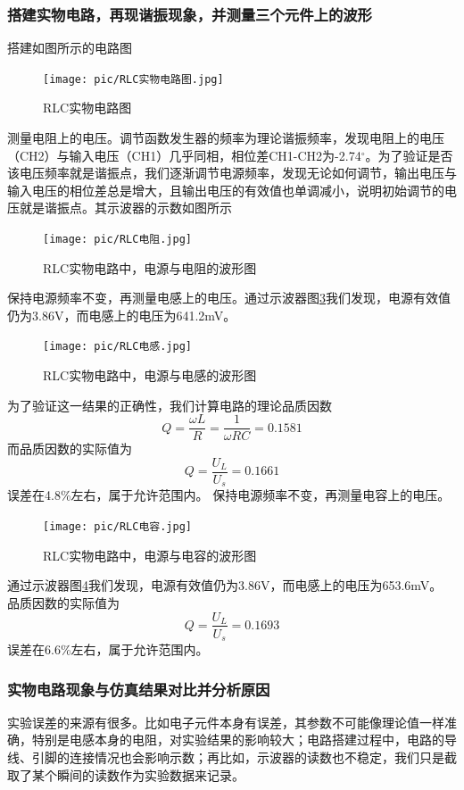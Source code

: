 \documentclass{ctexart}
\begin{document}
\subsubsection{搭建实物电路，再现谐振现象，并测量三个元件上的波形}
搭建如图所示的电路图
\begin{figure}[h]
    \centering
    \texttt{[image: pic/RLC实物电路图.jpg]}
    \caption{RLC实物电路图}
    \label{fig:RLC实物电路图}
\end{figure}
测量电阻上的电压。调节函数发生器的频率为理论谐振频率，发现电阻上的电压（CH2）与输入电压（CH1）几乎同相，相位差CH1-CH2为-2.74$^\circ$。为了验证是否该电压频率就是谐振点，我们逐渐调节电源频率，发现无论如何调节，输出电压与输入电压的相位差总是增大，且输出电压的有效值也单调减小，说明初始调节的电压就是谐振点。其示波器的示数如图所示
\begin{figure}[h]
    \centering
    \texttt{[image: pic/RLC电阻.jpg]}
    \caption{RLC实物电路中，电源与电阻的波形图}
    \label{fig:RLC实物电路中，电源与电阻的波形图}
\end{figure}
保持电源频率不变，再测量电感上的电压。通过示波器图\ref{fig:RLC实物电路中，电源与电感的波形图}我们发现，电源有效值仍为3.86V，而电感上的电压为641.2mV。
\begin{figure}[h]
    \centering
    \texttt{[image: pic/RLC电感.jpg]}
    \caption{RLC实物电路中，电源与电感的波形图}
    \label{fig:RLC实物电路中，电源与电感的波形图}
\end{figure}
为了验证这一结果的正确性，我们计算电路的理论品质因数
\begin{equation}
    Q=\dfrac{\omega L}{R}=\dfrac{1}{\omega RC}=0.1581
\end{equation}
而品质因数的实际值为
\begin{equation}
    Q=\dfrac{U_L}{U_s}=0.1661
\end{equation}
误差在4.8\%左右，属于允许范围内。
保持电源频率不变，再测量电容上的电压。
\begin{figure}[h]
    \centering
    \texttt{[image: pic/RLC电容.jpg]}
    \caption{RLC实物电路中，电源与电容的波形图}
    \label{fig:RLC实物电路中，电源与电容的波形图}
\end{figure}
通过示波器图\ref{fig:RLC实物电路中，电源与电容的波形图}我们发现，电源有效值仍为3.86V，而电感上的电压为653.6mV。
品质因数的实际值为
\begin{equation}
    Q=\dfrac{U_L}{U_s}=0.1693
\end{equation}
误差在6.6\%左右，属于允许范围内。
\subsubsection{实物电路现象与仿真结果对比并分析原因}
实验误差的来源有很多。比如电子元件本身有误差，其参数不可能像理论值一样准确，特别是电感本身的电阻，对实验结果的影响较大；电路搭建过程中，电路的导线、引脚的连接情况也会影响示数；再比如，示波器的读数也不稳定，我们只是截取了某个瞬间的读数作为实验数据来记录。
\end{document}
